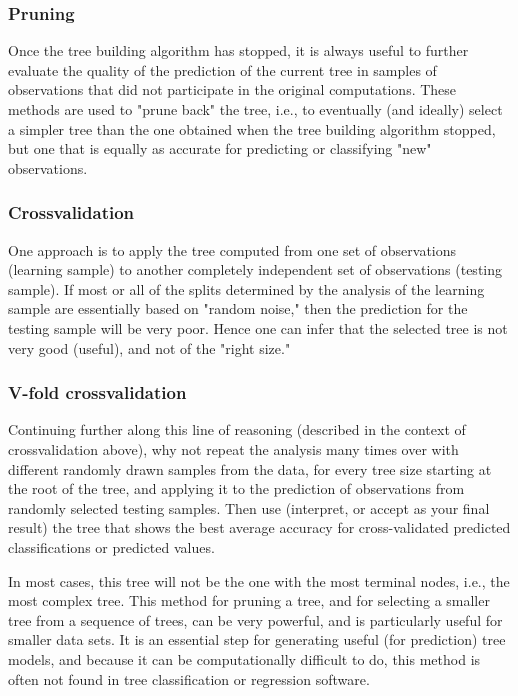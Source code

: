 \documentclass[caret-main.tex]{subfiles}
\begin{document}
\subsubsection{Pruning}
Once the tree building algorithm has stopped, it is always useful to further evaluate the quality of the prediction of the current tree in samples of observations that did not participate in the original computations. These methods are used to "prune back" the tree, i.e., to eventually (and ideally) select a simpler tree than the one obtained when the tree building algorithm stopped, but one that is equally as accurate for predicting or classifying "new" observations.

\subsubsection{Crossvalidation}
One approach is to apply the tree computed from one set of observations (learning sample) to another completely independent set of observations (testing sample). If most or all of the splits determined by the analysis of the learning sample are essentially based on "random noise," then the prediction for the testing sample will be very poor. Hence one can infer that the selected tree is not very good (useful), and not of the "right size."

\subsubsection{V-fold crossvalidation} 
Continuing further along this line of reasoning (described in the context of crossvalidation above), why not repeat the analysis many times over with different randomly drawn samples from the data, for every tree size starting at the root of the tree, and applying it to the prediction of observations from randomly selected testing samples. Then use (interpret, or accept as your final result) the tree that shows the best average accuracy for cross-validated predicted classifications or predicted values. 

In most cases, this tree will not be the one with the most terminal nodes, i.e., the most complex tree. This method for pruning a tree, and for selecting a smaller tree from a sequence of trees, can be very powerful, and is particularly useful for smaller data sets. It is an essential step for generating useful (for prediction) tree models, and because it can be computationally difficult to do, this method is often not found in tree classification or regression software.
\newpage
\end{document}
